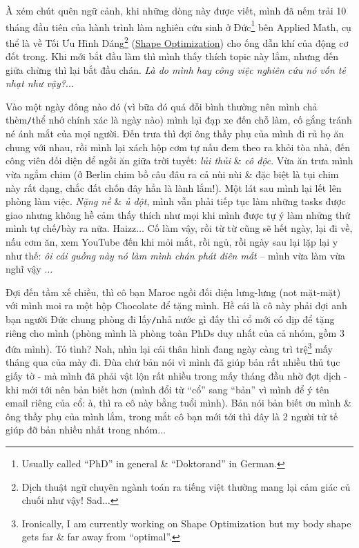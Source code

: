 \documentclass[12pt,oneside]{book}
\begin{document}
À xém chút quên ngữ cảnh, khi những dòng này được viết, mình đã nếm trải 10 tháng đầu tiên của hành trình làm nghiên cứu sinh ở Đức\footnote{Usually called ``PhD'' in general \& ``Doktorand'' in German.} bên Applied Math, cụ thể là về Tối Ưu Hình Dáng\footnote{Dịch thuật ngữ chuyên ngành toán ra tiếng việt thường mang lại cảm giác củ chuối như vậy! Sad$\ldots$} (\href{https://en.wikipedia.org/wiki/Shape_optimization}{Shape Optimization}) cho ống dẫn khí của động cơ đốt trong. Khi mới bắt đầu làm thì mình thấy thích topic này lắm, nhưng đến giữa chừng thì lại bắt đầu chán. {\it Là do mình hay công việc nghiên cứu nó vốn tẻ nhạt như vậy?}$\ldots$

Vào một ngày đông nào đó (vì bữa đó quá đỗi bình thường nên mình chả thèm{\tt/}thể nhớ chính xác là ngày nào) mình lại đạp xe đến chỗ làm, cố gắng tránh né ánh mắt của mọi người. Đến trưa thì đợi ông thầy phụ của mình đi rủ họ ăn chung với nhau, rồi mình lại xách hộp cơm tự nấu đem theo ra khỏi tòa nhà, đến công viên đối diện để ngồi ăn giữa trời tuyết: {\it lủi thủi} \& {\it cô độc}. Vừa ăn trưa mình vừa ngắm chim (ở Berlin chim bồ câu đâu ra cả nùi nùi \& đặc biệt là tụi chim này rất dạng, chắc đất chốn đây hẳn là lành lắm!). Một lát sau mình lại lết lên phòng làm việc. {\it Nặng nề} \& {\it ủ dột}, mình vẫn phải tiếp tục làm những tasks được giao nhưng không hề cảm thấy thích như mọi khi mình được tự ý làm những thứ mình tự chế{\tt/}bày ra nữa. Haizz$\ldots$ Cố làm vậy, rồi từ từ cũng sẽ hết ngày, lại đi về, nấu cơm ăn, xem YouTube đến khi mỏi mắt, rồi ngủ, rồi ngày sau lại lặp lại y như thế: {\it ôi cái guồng này nó làm mình chán phát điên mất} -- mình vừa làm vừa nghĩ vậy $\ldots$

Đợi đến tầm xế chiều, thì cô bạn Maroc ngồi đối diện lưng-lưng (not mặt-mặt) với mình moi ra một hộp Chocolate để tặng mình. Hề cái là cô này phải đợi anh bạn người Đức chung phòng đi lấy{\tt/}nhả nước gì đấy thì cổ mới có dịp để tặng riêng cho mình (phòng mình là phòng toàn PhDs duy nhất của cả nhóm, gồm 3 đứa mình). Tỏ tình? Nah, nhìn lại cái thân hình đang ngày càng trì trệ\footnote{Ironically, I am currently working on Shape Optimization but my body shape gets far \& far away from ``optimal''.} mấy tháng qua của mày đi. Đùa chứ bản nói vì mình đã giúp bản rất nhiều thủ tục giấy tờ - mà mình đã phải vật lộn rất nhiều trong mấy tháng đầu nhờ đợt dịch - khi mới tới nên bản biết hơn (mình đổi từ ``cổ'' sang ``bản'' vì mình để ý tên email riêng của cổ: à, thì ra cô này bằng tuổi mình). Bản nói bản biết ơn mình \& ông thầy phụ của mình lắm, trong mắt cô bạn mới tới thì đây là 2 người tử tế giúp đỡ bản nhiều nhất trong nhóm$\ldots$
\end{document}
